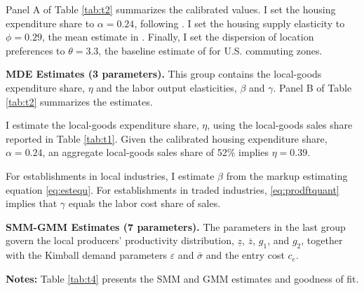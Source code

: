 Panel A of Table \ref{tab:t2} summarizes the calibrated values. I set the housing expenditure share to $\alpha = 0.24$, following \textcite{Davis&OrtaloMagne11}. I set the housing supply elasticity to $\phi = 0.29$, the mean estimate in \textcite{baum2024microgeography}. Finally, I set the dispersion of location preferences to $\theta = 3.3$, the baseline estimate of \textcite{monte2018commuting} for U.S. commuting zones.

\textbf{MDE Estimates (3 parameters).} This group contains the local-goods expenditure share, $\eta$ and the labor output elasticities, $\beta$ and $\gamma$. Panel B of Table \ref{tab:t2} summarizes the estimates.

I estimate the local-goods expenditure share, $\eta$, using the local-goods sales share reported in Table \ref{tab:t1}. Given the calibrated housing expenditure share, $\alpha = 0.24$, an aggregate local-goods sales share of 52\% implies $\eta = 0.39$.

For establishments in local industries, I estimate $\beta$ from the markup estimating equation \eqref{eq:estequ}. For establishments in traded industries, \eqref{eq:prodftquant} implies that $\gamma$ equals the labor cost share of sales.

\textbf{SMM-GMM Estimates (7 parameters).} The parameters in the last group govern the local producers' productivity distribution, $\underline{z}$, $\overline{z}$, $g_1$, and $g_2$, together with the Kimball demand parameters $\varepsilon$ and $\bar{\sigma}$ and the entry cost $c_e$.

\begin{table}[t]
	\centering
	\begin{threeparttable}
	\caption{SMM and GMM Estimates and Moment Fit}
	\label{tab:t4}%
	\begin{tablenotes}
	\item \footnotesize{\textbf{Notes:} Table \ref{tab:t4} presents the SMM and GMM estimates and goodness of fit.}
	\end{tablenotes}
	\end{threeparttable}
\end{table}%


